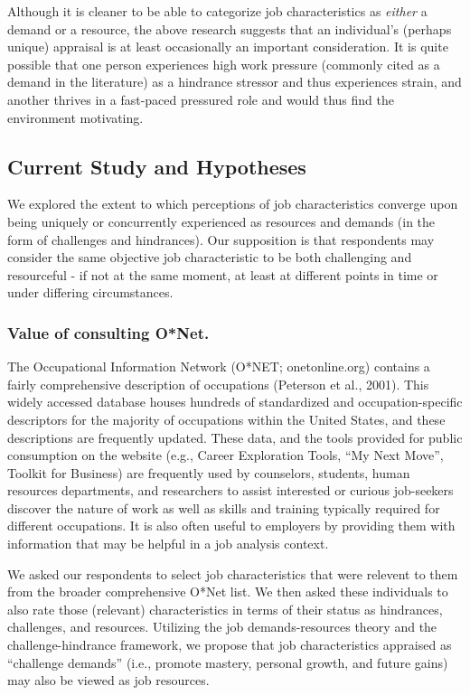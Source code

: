\documentclass[
  man]{apa6}
\begin{document}
Although it is cleaner to be able to categorize job characteristics as \emph{either} a demand or a resource, the above research suggests that an individual's (perhaps unique) appraisal is at least occasionally an important consideration. It is quite possible that one person experiences high work pressure (commonly cited as a demand in the literature) as a hindrance stressor and thus experiences strain, and another thrives in a fast-paced pressured role and would thus find the environment motivating.

\hypertarget{current-study-and-hypotheses}{%
\subsection{Current Study and Hypotheses}\label{current-study-and-hypotheses}}

We explored the extent to which perceptions of job characteristics converge upon being uniquely or concurrently experienced as resources and demands (in the form of challenges and hindrances). Our supposition is that respondents may consider the same objective job characteristic to be both challenging and resourceful - if not at the same moment, at least at different points in time or under differing circumstances.

\hypertarget{value-of-consulting-onet.}{%
\subsubsection{Value of consulting O*Net.}\label{value-of-consulting-onet.}}

The Occupational Information Network (O*NET; onetonline.org) contains a fairly comprehensive description of occupations (Peterson et al., 2001). This widely accessed database houses hundreds of standardized and occupation-specific descriptors for the majority of occupations within the United States, and these descriptions are frequently updated. These data, and the tools provided for public consumption on the website (e.g., Career Exploration Tools, ``My Next Move'', Toolkit for Business) are frequently used by counselors, students, human resources departments, and researchers to assist interested or curious job-seekers discover the nature of work as well as skills and training typically required for different occupations. It is also often useful to employers by providing them with information that may be helpful in a job analysis context.

We asked our respondents to select job characteristics that were relevent to them from the broader comprehensive O*Net list. We then asked these individuals to also rate those (relevant) characteristics in terms of their status as hindrances, challenges, and resources. Utilizing the job demands-resources theory and the challenge-hindrance framework, we propose that job characteristics appraised as ``challenge demands'' (i.e., promote mastery, personal growth, and future gains) may also be viewed as job resources.
\end{document}
